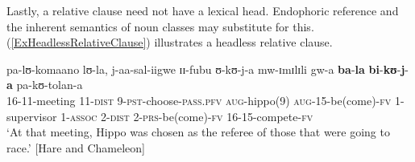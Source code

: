 Lastly, a relative clause need not have a lexical head. Endophoric reference and the inherent semantics of noun classes may substitute for this. (\ref{ExHeadlessRelativeClause}) illustrates a headless relative clause.
\begin{exe}
	\ex \label{ExHeadlessRelativeClause}
	\gll pa-lʊ-komaano lʊ-la, j-aa-sal-iigwe ɪɪ-fubu ʊ-kʊ-j-a mw-ɪmɪlɪli gw-a \textbf{ba}-\textbf{la} \textbf{bi}-\textbf{kʊ}-\textbf{j}-\textbf{a} pa-kʊ-tolan-a\\
	16-11-meeting 11-\textsc{dist} 9-\textsc{pst}-choose-\textsc{pass.pfv} \textsc{aug}-hippo(9) \textsc{aug}-15-be(come)-\textsc{fv} 1-supervisor 1-\textsc{assoc} 2-\textsc{dist} 2-\textsc{prs}-be(come)-\textsc{fv} 16-15-compete-\textsc{fv}\\
	\glt `At that meeting, Hippo was chosen as the referee of those that were going to race.' [Hare and Chameleon]
\end{exe}
